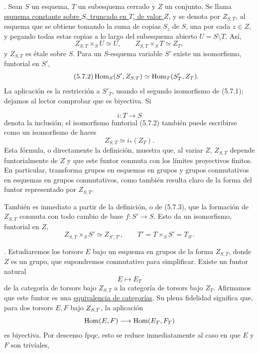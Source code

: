 
\medskip
{}. Sean $S$ un esquema, $T$ un subesquema cerrado y $Z$
un conjunto. Se llama \underline{esquema constante sobre $S$, truncado
en $T$, de valor $Z$}, y se denota por $Z_{S,T}$, al esquema que se
obtiene tomando la suma de copias $S_z$ de $S$, una por cada $z\in Z$,
y pegando todas estas copias a lo largo del subesquema abierto
$U=S\setminus T$. Así,
\begin{equation}\tag{5.7.1}
 Z_{S,T}\times_S U\simeq U,
 \qquad
 Z_{S,T}\times_S T\simeq Z_T,
\end{equation}
y $Z_{S,T}$ es étale sobre $S$. Para un $S$-esquema variable $S'$
existe un isomorfismo, funtorial en $S'$,
\begin{equation}\tag{5.7.2}
 \Hom_S(S',Z_{S,T})\simeq\Hom_T(S'_T,Z_T).
\end{equation}
La aplicación es la restricción a $S'_T$, usando el segundo
isomorfismo de (5.7.1); dejamos al lector comprobar que es biyectiva.
Si


\[
 i:T\longrightarrow S
\]
denota la inclusión, el isomorfismo funtorial (5.7.2) también puede
escribirse como un isomorfismo de haces
\begin{equation}\tag{5.7.3}
 Z_{S,T}\simeq i_*(Z_T).
\end{equation}
Esta fórmula, o directamente la definición, muestra que, al variar
$Z$, $Z_{S,T}$ depende funtorialmente de $Z$ y que este funtor conmuta
con los límites proyectivos finitos. En particular, transforma grupos
en esquemas en grupos y grupos conmutativos en esquemas en grupos
conmutativos, como también resulta claro de la forma
 del funtor representado por $Z_{S,T}$.

También es inmediato a partir de la definición, o de (5.7.3), que la
formación de $Z_{S,T}$ conmuta con todo cambio de base $f:S'\to S$.
Esto da un isomorfismo, funtorial en $Z$,
\begin{equation}\tag{5.7.4}
 Z_{S,T}\times_S S'\simeq Z_{S',T'},
 \qquad T'=T\times_S S'=T_{S'}.
\end{equation}

\medskip
{}. Estudiaremos los torsors $E$ bajo un esquema en grupos
de la forma $Z_{S,T}$, donde $Z$ es un grupo, que supondremos
conmutativo para simplificar. Existe un funtor natural
\begin{equation}\tag{5.8.0}
 E\longmapsto E_T
\end{equation}
de la categoría de torsors bajo $Z_{S,T}$ a la categoría de torsors
bajo $Z_T$. Afirmamos que este funtor es una
\underline{equivalencia de categorías}. Su plena fidelidad significa
que, para dos torsors $E,F$ bajo $\sisi{G_{S,T}}{Z_{S,T}}$, la
aplicación
\[
 \Hom(E,F)\longrightarrow\Hom(E_T,F_T)
\]
es biyectiva. Por descenso fpqc, esto se reduce inmediatamente al caso
en que $E$ y $F$ son triviales,


